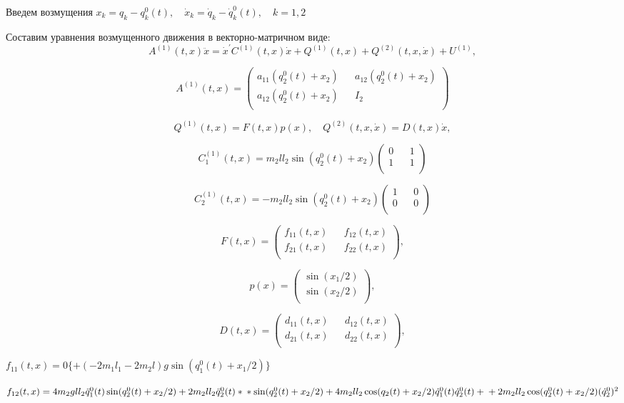 Введем возмущения $x_k = q_k - q_k^0(t), \quad \dot x_k = \dot q_k - \dot q_k^0(t), \quad k = 1, 2$

Составим уравнения возмущенного движения в векторно-матричном виде:
\begin{equation}
A^{(1)}(t, x) \ddot x = {\dot x^{'} C^{(1)}(t, x) \dot x} + Q^{(1)}(t,x) + Q^{(2)}(t, x, \dot x) + U^{(1)}, \label{2.2'}
\end{equation}

$$A^{(1)}(t, x) =
\begin{pmatrix}
a_{11} (q_2^0 (t) + x_2) && a_{12} (q_2^0 (t) + x_2) \\
a_{12} (q_2^0 (t) + x_2) && I_2 \\
\end{pmatrix}$$

$$Q^{(1)}(t,x)=F(t,x)p(x), \quad Q^{(2)}(t,x,\dot x)=D(t,x)\dot x, $$

$$C_1^{(1)}(t, x) = m_2 l l_2 \sin (q_2^0 (t) + x_2)
\begin{pmatrix}
0 && 1\\
1 && 1\\
\end{pmatrix}$$

$$C_2^{(1)}(t, x) = - m_2 l l_2 \sin (q_2^0 (t) + x_2)
\begin{pmatrix}
1 && 0\\
0 && 0\\
\end{pmatrix}$$

$$F(t, x) =
\begin{pmatrix}
f_{11}(t,x) && f_{12}(t,x) \\
f_{21}(t,x) && f_{22}(t,x)\\
\end{pmatrix},$$

$$p(x) =
\begin{pmatrix}
\sin(x_1/2) \\
\sin(x_2/2)\\
\end{pmatrix},$$

$$D(t, x) =
\begin{pmatrix}
d_{11} (t, x) && d_{12} (t, x) \\
d_{21} (t, x) && d_{22} (t, x) \\
\end{pmatrix},$$

$f_{11}(t,x) = 0 \{ + (- 2 m_1 l_1 - 2 m_2 l) g \sin (q_1^0 (t) + x_1 / 2) \}$

$f_{12}(t,x) = 4 m_2 g l l_2 \ddot q_1^0 (t) \sin (q_2^0 (t) + x_2 / 2) + 2 m_2 l l_2 \ddot q_2^0 (t) * \\ 
* \sin (q_2^0 (t) + x_2 / 2) + 4 m_2 l l_2 \cos (q_2(t) + x_2 / 2) \dot q_1^0 (t) \dot q_2^0 (t) + \\ 
+ 2 m_2 l l_2 \cos (q_2^0 (t) + x_2 / 2) (\dot q_2^0)^2$

